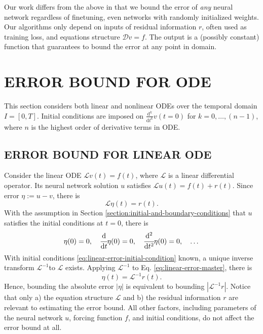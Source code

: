 \documentclass{uai2023}
\newcommand{\dt}[1]{\cfrac{\mathrm{d} #1}{\mathrm{d} t}}
\newcommand{\dnt}[2]{\cfrac{\mathrm{d}^{#1} #2}{\mathrm{d} t^{#1}}}
\newcommand{\Err}{\eta}
\renewcommand{\L}{\mathcal{L}}
\begin{document}
    Our work differs from the above in that we bound the error of \textit{any} neural network regardless of finetuning, even networks with randomly initialized weights.
    Our algorithms only depend on inputs of residual information $r$, often used as training loss, and equations structure $\mathcal{D} v = f$.
    The output is a (possibly constant) function that guarantees to bound the error at any point in domain.

\section{ERROR BOUND FOR ODE}  \label{section:error-bound-for-ode}
    This section considers both linear and nonlinear ODEs over the temporal domain $I=[0, T]$. 
    Initial conditions are imposed on $\frac{\mathrm{d}^k}{\mathrm{d}t^k}v(t=0)$ for $k = 0, \dots, (n - 1)$, where $n$ is the highest order of derivative terms in ODE.

\subsection{ERROR BOUND FOR LINEAR ODE}\label{section:error-bound-for-linear-odes}
    Consider the linear ODE $\L v(t) = f(t)$, where $\L$ is a linear differential operator. 
    Its neural network solution $u$ satisfies $\L u(t) = f(t) + r(t)$. 
    Since error $\Err := u - v$, there is
    {   
        \small
        \begin{equation} \label{eq:linear-error-master}
            \L \Err(t) = r(t).
        \end{equation}
    }
    With the assumption in Section \ref{section:initial-and-boundary-conditions} that $u$ satisfies the initial conditions at $t=0$, there is
    {
        \small
        \begin{equation} \label{eq:linear-error-initial-condition}
            \Err(0) = 0, \quad \dt{}{}\Err(0) = 0, \quad \dnt{2}{}\Err(0) = 0, \quad \dots 
        \end{equation}
    }
    With initial conditions \ref{eq:linear-error-initial-condition} known, a unique inverse transform $\L^{-1}$to $\L$ exists. 
    Applying $\L^{-1}$ to Eq. \ref{eq:linear-error-master}, there is 
    {
        \small
        \begin{equation}\label{eq:linear-error-inverse-master}
            \Err(t) = \L^{-1} r(t).
        \end{equation}
    }
    Hence, bounding the absolute error $\left|\Err\right|$ is equivalent to bounding $\left|\L^{-1} r\right|$. 
    Notice that only a) the equation structure $\L$ and b) the residual information $r$ are relevant to estimating the error bound. 
    All other factors, including parameters of the neural network $u$, forcing function $f$, and initial conditions, do not affect the error bound at all.
\end{document}
